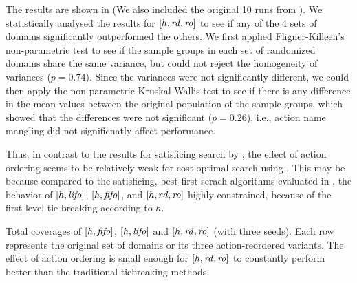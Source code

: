 The results are shown in  (We
also included the original 10 runs from  ).
We statistically analysed the results for $[h,\mbox{\textit{rd}},\mbox{\textit{ro}}]$ 
to see if any of the 4 sets of domains
significantly outperformed the others.
We first applied Fligner-Killeen's non-parametric test to see if the sample groups 
in each set of randomized domains share the same variance, 
but could not reject the homogeneity of variances ($p=0.74$).
Since the variances were not significantly different,
we could then apply the non-parametric Kruskal-Wallis test to see if
there is any difference in the mean values between the original
population of the sample groups, which showed that the differences were not significant ($p=0.26$),
i.e., action name mangling did not significnatly affect performance.

Thus, in contrast to the results for satisficing search by \cite{vallati2015effective}, 
the effect of action ordering  seems to be relatively weak for cost-optimal search using \astar.
This may be because 
compared to the satisficing, best-first serach algorithms evaluated in \cite{vallati2015effective},
the behavior of $[h,\mbox{\textit{lifo}}]$, $[h,\mbox{\textit{fifo}}]$, and $[h,rd,\mbox{\textit{ro}}]$ highly
constrained, because of the first-level tie-breaking according to $h$.

\begin{table}[tb]
 \setlength{\tabcolsep}{0.2em}
 \centering {}
 
 \caption{Total coverages of $[h,\mbox{\textit{fifo}}]$, $[h,\mbox{\textit{lifo}}]$
 and $[h,\mbox{\textit{rd}},\mbox{\textit{ro}}]$ (with three seeds). Each row represents the original set of
 domains or its three action-reordered variants. The effect
 of action ordering is small enough for $[h,\mbox{\textit{rd}},\mbox{\textit{ro}}]$ to
 constantly perform better than the traditional tiebreaking methods.}
 \label{actionordering-robustness}
\end{table}

